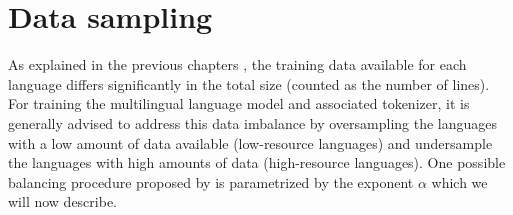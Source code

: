 

\section{Data sampling}
\label{sec:data_sampling}



As explained in the previous chapters , the training data available for each language differs significantly in the total size (counted as the number of lines). For training the multilingual language model and associated tokenizer, it is generally advised to address this data imbalance by oversampling the languages with a low amount of data available (low-resource languages) and undersample the languages with high amounts of data (high-resource languages). One possible balancing procedure proposed by \citet{devlin_bert_2019,conneau_unsupervised_2020} is parametrized by the exponent $\alpha$ which we will now describe.

